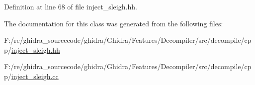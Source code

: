 Definition at line 68 of file inject\+\_\+sleigh.\+hh.



The documentation for this class was generated from the following files\+:\begin{DoxyCompactItemize}
\item 
F\+:/re/ghidra\+\_\+sourcecode/ghidra/\+Ghidra/\+Features/\+Decompiler/src/decompile/cpp/\mbox{\hyperlink{inject__sleigh_8hh}{inject\+\_\+sleigh.\+hh}}\item 
F\+:/re/ghidra\+\_\+sourcecode/ghidra/\+Ghidra/\+Features/\+Decompiler/src/decompile/cpp/\mbox{\hyperlink{inject__sleigh_8cc}{inject\+\_\+sleigh.\+cc}}\end{DoxyCompactItemize}
